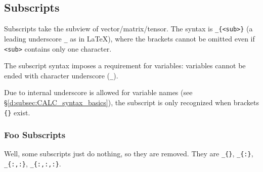 \subsection{Subscripts}\label{d:subsec:CALC_sub}
Subscripts take the subview of vector/matrix/tensor.
The syntax is \verb`_{<sub>}` (a leading underscore \texttt{\_}\indextt{\_} as in \LaTeX{}),
where the brackets cannot be omitted
even if \texttt{<sub>} contains only one character.
\begin{warning}
  The subscript syntax imposes a requirement for variables:
  variables cannot be ended with character underscore (\texttt{\_}).

  Due to internal underscore is allowed for variable names (see \S\ref{d:subsec:CALC_syntax_basics}),
  the subscript is only recognized when brackets \texttt{\{\}} exist.
\end{warning}
\subsubsection{Foo Subscripts}
Well, some subscripts just do nothing, so they are removed.
They are \verb`_{}`, \verb`_{:}`, \verb`_{:,:}`, \verb`_{:,:,:}`.
